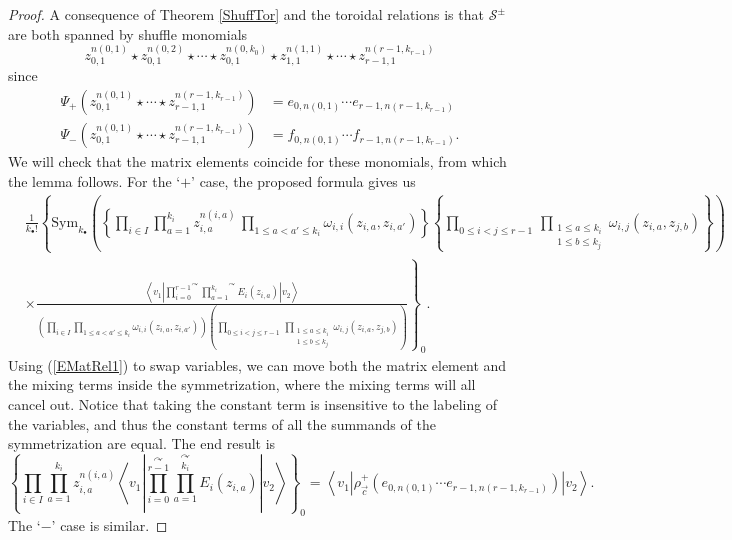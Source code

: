 \documentclass{amsart}
\theoremstyle{remark}
\numberwithin{thm}{section}
\numberwithin{equation}{section}
\begin{document}
\begin{proof}
A consequence of Theorem \ref{ShuffTor} and the toroidal relations is that $\mathcal{S}^\pm$ are both spanned by shuffle monomials
\[
z_{0,1}^{n(0,1)}\star z_{0,1}^{n(0,2)}\star\cdots\star z_{0,1}^{n(0,k_0)}\star z_{1,1}^{n(1,1)}\star\cdots\star z_{r-1,1}^{n(r-1,k_{r-1})}
\]
since
\begin{align*}
\Psi_+\left( z_{0,1}^{n(0,1)}\star\cdots\star z_{r-1,1}^{n(r-1,k_{r-1})} \right)&= e_{0,n(0,1)}\cdots e_{r-1,n(r-1,k_{r-1})}\\
\Psi_-\left(z_{0,1}^{n(0,1)}\star\cdots\star z_{r-1,1}^{n(r-1,k_{r-1})} \right)&= f_{0,n(0,1)}\cdots f_{r-1,n(r-1,k_{r-1})}.
\end{align*}
We will check that the matrix elements coincide for these monomials, from which the lemma follows.
For the `$+$' case, the proposed formula gives us
\begin{align*}
&\frac{1}{k_\bullet!}\left\{
\displaystyle\mathrm{Sym}_{k_\bullet}\left(\left\{\prod_{i\in I}\prod_{a=1}^{k_i}z_{i,a}^{n(i,a)}
\,\prod_{1\le a<a'\le k_i}\omega_{i,i}(z_{i,a},z_{i,a'})\right\}
\left\{ \prod_{0\le i<j\le r-1}\,\prod_{\substack{1\le a\le k_i\\1\le b\le k_j}}\omega_{i,j}(z_{i,a},z_{j,b}) \right\}\right)\right.\\
&\times\left.\frac{\displaystyle\left\langle v_1\left| \overset{\curvearrowright}{\prod_{i=0}^{r-1}}\overset{\curvearrowright}{\prod_{a=1}^{k_i}} E_{i}(z_{i,a})\right|v_2\right\rangle}
{\displaystyle\left(\prod_{i\in I}\prod_{1\le a<a'\le k_i}\omega_{i,i}(z_{i,a},z_{i,a'})\right)
\left(\prod_{0\le i< j\le r-1}\,\prod_{\substack{1\le a\le k_i\\1\le b\le k_j}}\omega_{i,j}(z_{i,a},z_{j,b})\right)}\right\}_0.
\end{align*}
Using (\ref{EMatRel1}) to swap variables, we can move both the matrix element and the mixing terms inside the symmetrization, where the mixing terms will all cancel out.
Notice that taking the constant term is insensitive to the labeling of the variables, and thus the constant terms of all the summands of the symmetrization are equal.
The end result is
\[
\left\{\prod_{i\in I}\prod_{a=1}^{k_i}z_{i,a}^{n(i,a)}
\left\langle v_1\left| \overset{\curvearrowright}{\prod_{i=0}^{r-1}}\overset{\curvearrowright}{\prod_{a=1}^{k_i}} E_{i}(z_{i,a})\right|v_2\right\rangle\right\}_0
=\left\langle v_1\left|\rho_{\vec{c}}^{+}\left(e_{0,n(0,1)}\cdots e_{r-1,n(r-1,k_{r-1})}  \right)\right|v_2\right\rangle.
\]
The `$-$' case is similar.
\end{proof}
\end{document}

